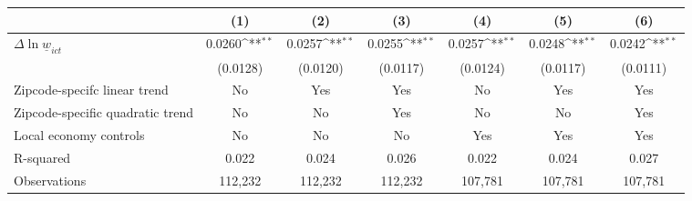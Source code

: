 {
\def\sym#1{\ifmmode^{#1}\else\(^{#1}\)\fi}
\begin{tabular}{l*{6}{c}}
\hline\hline
          &\multicolumn{1}{c}{(1)}         &\multicolumn{1}{c}{(2)}         &\multicolumn{1}{c}{(3)}         &\multicolumn{1}{c}{(4)}         &\multicolumn{1}{c}{(5)}         &\multicolumn{1}{c}{(6)}         \\
\hline
$\Delta \ln \underline{w}_{ict}$&   0.0260\sym{**} &   0.0257\sym{**} &   0.0255\sym{**} &   0.0257\sym{**} &   0.0248\sym{**} &   0.0242\sym{**} \\
          & (0.0128)         & (0.0120)         & (0.0117)         & (0.0124)         & (0.0117)         & (0.0111)         \\
\hline
Zipcode-specifc linear trend&       No         &      Yes         &      Yes         &       No         &      Yes         &      Yes         \\
Zipcode-specific quadratic trend&       No         &       No         &      Yes         &       No         &       No         &      Yes         \\
Local economy controls&       No         &       No         &       No         &      Yes         &      Yes         &      Yes         \\
R-squared &    0.022         &    0.024         &    0.026         &    0.022         &    0.024         &    0.027         \\
Observations&  112,232         &  112,232         &  112,232         &  107,781         &  107,781         &  107,781         \\
\hline\hline
\end{tabular}
}
